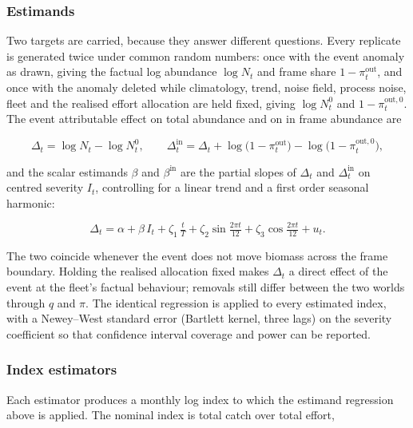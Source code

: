 \documentclass[
  11pt,
  a4paper,
]{article}
\begin{document}
\hypertarget{estimands}{%
\subsubsection{Estimands}\label{estimands}}

Two targets are carried, because they answer different questions. Every
replicate is generated twice under common random numbers: once with the
event anomaly as drawn, giving the factual log abundance \(\log N_t\)
and frame share \(1 - \pi^{\text{out}}_t\), and once with the anomaly
deleted while climatology, trend, noise field, process noise, fleet and
the realised effort allocation are held fixed, giving \(\log N^{0}_t\)
and \(1 - \pi^{\text{out},0}_t\). The event attributable effect on total
abundance and on in frame abundance are

\begin{equation}
\Delta_t = \log N_t - \log N^{0}_t, \qquad \Delta^{\text{in}}_t = \Delta_t + \log\!\big(1 - \pi^{\text{out}}_t\big) - \log\!\big(1 - \pi^{\text{out},0}_t\big),
\end{equation}

\noindent and the scalar estimands \(\beta\) and \(\beta^{\text{in}}\) are the
partial slopes of \(\Delta_t\) and \(\Delta^{\text{in}}_t\) on centred
severity \(I_t\), controlling for a linear trend and a first order
seasonal harmonic:

\begin{equation}
\Delta_t = \alpha + \beta\,I_t + \zeta_1\,\tfrac{t}{T} + \zeta_2 \sin\!\tfrac{2\pi t}{12} + \zeta_3 \cos\!\tfrac{2\pi t}{12} + u_t.
\end{equation}

\noindent The two coincide whenever the event does not move biomass across the
frame boundary. Holding the realised allocation fixed makes \(\Delta_t\)
a direct effect of the event at the fleet's factual behaviour; removals
still differ between the two worlds through \(q\) and \(\pi\). The
identical regression is applied to every estimated index, with a
Newey--West standard error (Bartlett kernel, three lags) on the severity
coefficient so that confidence interval coverage and power can be
reported.

\hypertarget{index-estimators}{%
\subsubsection{Index estimators}\label{index-estimators}}

Each estimator produces a monthly log index to which the estimand
regression above is applied. The nominal index is total catch over total
effort,
\end{document}
